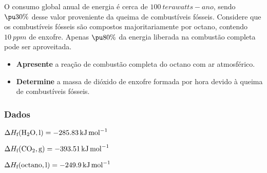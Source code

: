\documentclass[braun, twocolumn]{braun}
\begin{document}
\begin{problem}
[2A34]O consumo global anual de energia é cerca de \(\qty{100}{terawatts-ano}\),
sendo \(\pu{30\%}\) desse valor proveniente da queima de combustíveis
fósseis. Considere que os combustíveis fósseis são compostos
majoritariamente por octano, contendo \(\qty{10}{ppm}\) de enxofre. Apenas
\(\pu{80\%}\) da energia liberada na combustão completa pode ser
aproveitada.

\begin{itemize}

\item
  \textbf{Apresente} a reação de combustão completa do octano com ar
  atmosférico.
\item
  \textbf{Determine} a massa de dióxido de enxofre formada por hora
  devido à queima de combustíveis fósseis.
\end{itemize}
\subsubsection*{Dados}


\begin{datalist}

\item $\Delta H_\text{f}(\ce{H2O, {l}}) = \qty{-285,83}{kJ.mol^{-1}}$
\item $\Delta H_\text{f}(\ce{CO2, {g}}) = \qty{-393,51}{kJ.mol^{-1}}$
\item $\Delta H_\text{f}(\ce{octano, {l}}) = \qty{-249,9}{kJ.mol^{-1}}$
\end{datalist}

\end{problem}
\end{document}

